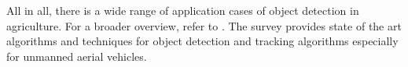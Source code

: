 All in all, there is a wide range of application cases of object detection in agriculture. For a broader overview, refer to \cite{applications_review}. The survey provides state of the art algorithms and techniques for object detection and tracking algorithms especially for unmanned aerial vehicles.